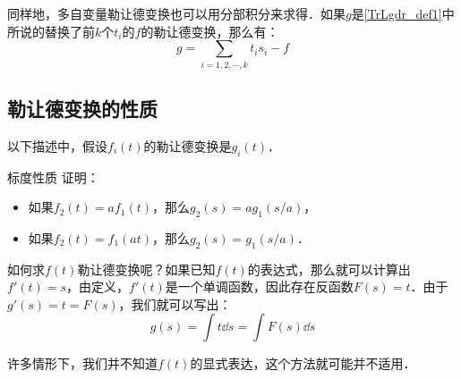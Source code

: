 同样地，多自变量勒让德变换也可以用分部积分来求得．如果$g$是\autoref{TrLgdr_def1}中所说的替换了前$k$个$t_i$的$f$的勒让德变换，那么有：\begin{equation}
g=\sum\limits_{i=1,2,\cdots, k}t_is_i-f
\end{equation}

\subsection{勒让德变换的性质}

以下描述中，假设$f_i(t)$的勒让德变换是$g_i(t)$．

\begin{exercise}{标度性质}
证明：
\begin{itemize}
\item 如果$f_2(t)=af_1(t)$，那么$g_2(s)=ag_1(s/a)$，
\item 如果$f_2(t)=f_1(at)$，那么$g_2(s)=g_1(s/a)$．
\end{itemize}
\end{exercise}







如何求$f(t)$勒让德变换呢？如果已知$f(t)$的表达式，那么就可以计算出$f'(t)=s$，由定义，$f'(t)$是一个单调函数，因此存在反函数$F(s)=t$．由于$g'(s)=t=F(s)$，我们就可以写出：
\begin{equation}
g(s)=\int t \dd{s}=\int F(s) \dd{s}
\end{equation}

许多情形下，我们并不知道$f(t)$的显式表达，这个方法就可能并不适用．


